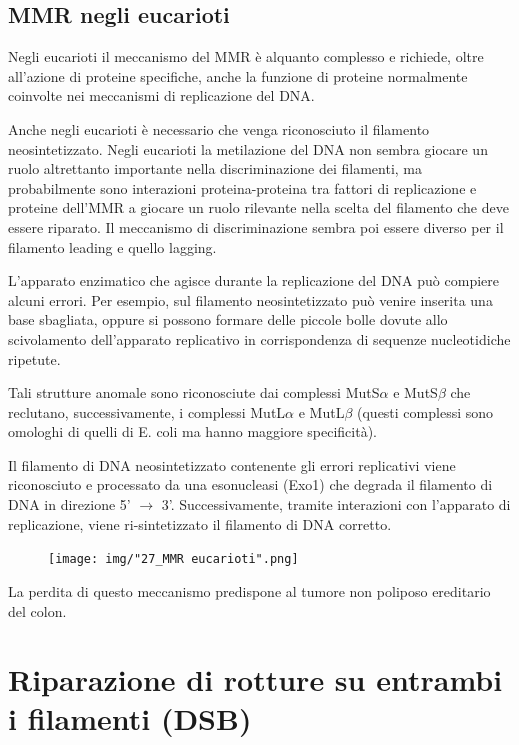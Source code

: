\documentclass[11pt]{book}
\begin{document}
\subsection{MMR negli eucarioti}\label{mmr-negli-eucarioti}

Negli eucarioti il meccanismo del MMR è alquanto complesso e richiede,
oltre all'azione di proteine specifiche, anche la funzione di proteine
normalmente coinvolte nei meccanismi di replicazione del DNA.

Anche negli eucarioti è necessario che venga riconosciuto il filamento
neosintetizzato. Negli eucarioti la metilazione del DNA non sembra
giocare un ruolo altrettanto importante nella discriminazione dei
filamenti, ma probabilmente sono interazioni proteina-proteina tra
fattori di replicazione e proteine dell'MMR a giocare un ruolo rilevante
nella scelta del filamento che deve essere riparato. Il meccanismo di
discriminazione sembra poi essere diverso per il filamento leading e
quello lagging.

L'apparato enzimatico che agisce durante la replicazione del DNA può
compiere alcuni errori. Per esempio, sul filamento neosintetizzato può
venire inserita una base sbagliata, oppure si possono formare delle
piccole bolle dovute allo scivolamento dell'apparato replicativo in
corrispondenza di sequenze nucleotidiche ripetute.

Tali strutture anomale sono riconosciute dai complessi MutS\(\alpha\) e
MutS\(\beta\) che reclutano, successivamente, i complessi MutL\(\alpha\)
e MutL\(\beta\) (questi complessi sono omologhi di quelli di E. coli ma
hanno maggiore specificità).

Il filamento di DNA neosintetizzato contenente gli errori replicativi
viene riconosciuto e processato da una esonucleasi (Exo1) che degrada il
filamento di DNA in direzione 5' \(\rightarrow\) 3'. Successivamente,
tramite interazioni con l'apparato di replicazione, viene
ri-sintetizzato il filamento di DNA corretto.

\begin{figure}[htp]
\centering
\texttt{[image: img/"27\_MMR eucarioti".png]}
\caption{}
\label{mmr-eucarioti}
\end{figure}

La perdita di questo meccanismo predispone al tumore non poliposo
ereditario del colon.

\section{Riparazione di rotture su entrambi i filamenti
(DSB)}\label{riparazione-di-rotture-su-entrambi-i-filamenti-dsb}
\end{document}
